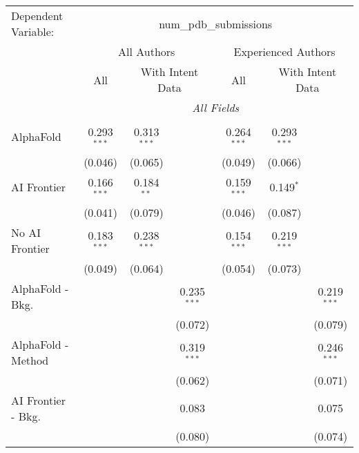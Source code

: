 \begingroup
\centering
\begin{tabular}{lcccccc}
   \tabularnewline \midrule \midrule
   Dependent Variable: & \multicolumn{6}{c}{num\_pdb\_submissions}\\
 & \multicolumn{3}{c}{All Authors} & \multicolumn{3}{c}{Experienced Authors} \\
\cmidrule(lr){2-4} \cmidrule(lr){5-7}
 & \multicolumn{1}{c}{All} & \multicolumn{2}{c}{With Intent Data} & \multicolumn{1}{c}{All} & \multicolumn{2}{c}{With Intent Data} \\
\cmidrule(lr){2-2} \cmidrule(lr){3-4} \cmidrule(lr){5-5} \cmidrule(lr){6-7}
 & \multicolumn{6}{c}{\textit{All Fields}} \\ \\
   AlphaFold               & 0.293$^{***}$ & 0.313$^{***}$ &               & 0.264$^{***}$ & 0.293$^{***}$ &   \\   
                           & (0.046)       & (0.065)       &               & (0.049)       & (0.066)       &   \\   
   AI Frontier             & 0.166$^{***}$ & 0.184$^{**}$  &               & 0.159$^{***}$ & 0.149$^{*}$   &   \\   
                           & (0.041)       & (0.079)       &               & (0.046)       & (0.087)       &   \\   
   No AI Frontier          & 0.183$^{***}$ & 0.238$^{***}$ &               & 0.154$^{***}$ & 0.219$^{***}$ &   \\   
                           & (0.049)       & (0.064)       &               & (0.054)       & (0.073)       &   \\   
   AlphaFold - Bkg.        &               &               & 0.235$^{***}$ &               &               & 0.219$^{***}$\\   
                           &               &               & (0.072)       &               &               & (0.079)\\   
   AlphaFold - Method      &               &               & 0.319$^{***}$ &               &               & 0.246$^{***}$\\   
                           &               &               & (0.062)       &               &               & (0.071)\\   
   AI Frontier - Bkg.      &               &               & 0.083         &               &               & 0.075\\   
                           &               &               & (0.080)       &               &               & (0.074)\\   

\end{tabular}
